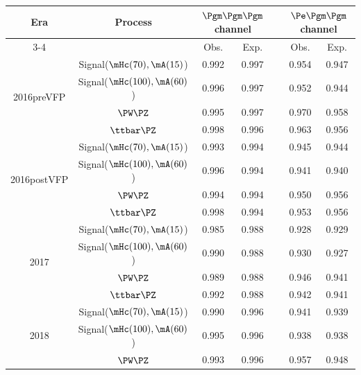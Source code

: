 \begin{table}[htbp]
  \centering
  \begin{tabular}{ccccccc}
    \hline
    \multirow{2}{*}{Era} & \multirow{2}{*}{Process} & \multicolumn{2}{c}{$\Pgm\Pgm\Pgm$ channel} & & \multicolumn{2}{c}{$\Pe\Pgm\Pgm$ channel} \\
    \cline{3-4} \cline{6-7}
    & & Obs. & Exp. & & Obs. & Exp. \\
    \hline
    \multirow{4}{*}{2016preVFP}  & Signal($\mHc(70), \mA(15)$)   & 0.992 & 0.997 & & 0.954 & 0.947 \\
                                 & Signal($\mHc(100), \mA(60)$)  & 0.996 & 0.997 & & 0.952 & 0.944 \\
                                 & $\PW\PZ$                      & 0.995 & 0.997 & & 0.970 & 0.958 \\
                                 & $\ttbar\PZ$                   & 0.998 & 0.996 & & 0.963 & 0.956 \\
    \hline
    \multirow{4}{*}{2016postVFP} & Signal($\mHc(70), \mA(15)$)   & 0.993 & 0.994 & & 0.945 & 0.944 \\
                                 & Signal($\mHc(100), \mA(60)$)  & 0.996 & 0.994 & & 0.941 & 0.940 \\
                                 & $\PW\PZ$                      & 0.994 & 0.994 & & 0.950 & 0.956 \\
                                 & $\ttbar\PZ$                   & 0.998 & 0.994 & & 0.953 & 0.956 \\
    \hline
    \multirow{4}{*}{2017}        & Signal($\mHc(70), \mA(15)$)   & 0.985 & 0.988 & & 0.928 & 0.929 \\
                                 & Signal($\mHc(100), \mA(60)$)  & 0.990 & 0.988 & & 0.930 & 0.927 \\
                                 & $\PW\PZ$                      & 0.989 & 0.988 & & 0.946 & 0.941 \\
                                 & $\ttbar\PZ$                   & 0.992 & 0.988 & & 0.942 & 0.941 \\
    \hline
    \multirow{4}{*}{2018}        & Signal($\mHc(70), \mA(15)$)   & 0.990 & 0.996 & & 0.941 & 0.939 \\
                                 & Signal($\mHc(100), \mA(60)$)  & 0.995 & 0.996 & & 0.938 & 0.938 \\
                                 & $\PW\PZ$                      & 0.993 & 0.996 & & 0.957 & 0.948 \\

\end{tabular}
\end{table}
